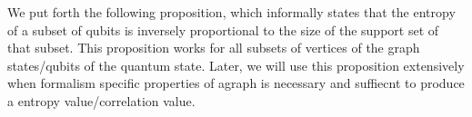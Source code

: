\documentclass{article}
\newcommand{\ket}[1]{|#1\rangle}
\begin{document}
 





 

We put forth the following proposition, which informally states that the entropy of a subset of qubits is inversely proportional to the size of the support set of that subset. This proposition works for all subsets of vertices of the graph states/qubits of the quantum state. Later, we will use this proposition extensively when formalism specific properties of agraph is necessary and suffiecnt to produce a entropy value/correlation value.
\end{document}
